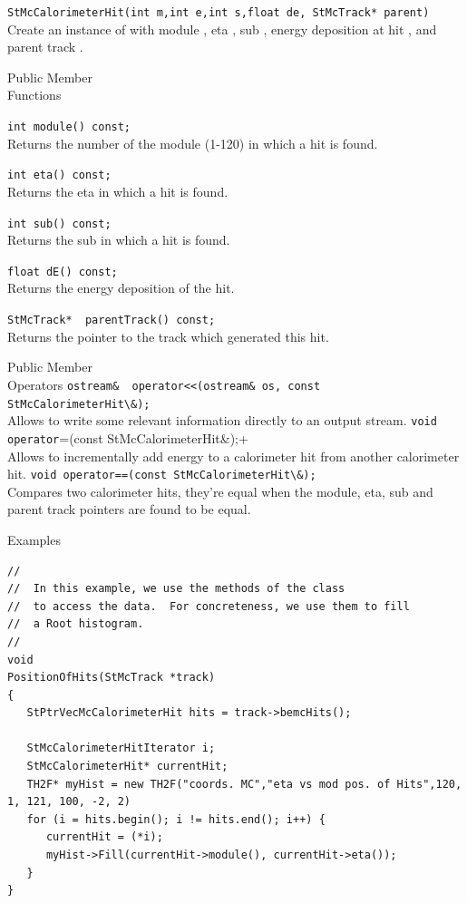 \begin{Entry}
    \verb+StMcCalorimeterHit(int m,int e,int s,float de, StMcTrack* parent)+\\
    Create an instance of  with module ,
    eta , sub , energy deposition at hit ,
    and parent track .

\item[Public Member\\ Functions]

    \verb+int module() const;+\\
    Returns the number of the module (1-120) in which a hit is found. 

    \verb+int eta() const;+\\
    Returns the eta in which a hit is found. 

    \verb+int sub() const;+\\
    Returns the sub in which a hit is found. 

    \verb+float dE() const;+\\
    Returns the energy deposition of the hit.

    \verb+StMcTrack*  parentTrack() const;+\\
    Returns the pointer to the track which generated this hit.

\item[Public Member\\ Operators]
    \verb+ostream&  operator<<(ostream& os, const StMcCalorimeterHit\&);+\\
    Allows to write some relevant information directly to an output
    stream.
    \verb+void operator+=(const StMcCalorimeterHit\&);+\\
    Allows to incrementally add energy to a calorimeter hit from another
    calorimeter hit.
    \verb+void operator==(const StMcCalorimeterHit\&);+\\
    Compares two calorimeter hits, they're equal when the module, eta, sub
    and parent track pointers are found to be equal.

\item[Examples]
{\footnotesize
\begin{verbatim}
//
//  In this example, we use the methods of the class
//  to access the data.  For concreteness, we use them to fill
//  a Root histogram. 
//  
void
PositionOfHits(StMcTrack *track)
{
   StPtrVecMcCalorimeterHit hits = track->bemcHits();

   StMcCalorimeterHitIterator i;
   StMcCalorimeterHit* currentHit;
   TH2F* myHist = new TH2F("coords. MC","eta vs mod pos. of Hits",120, 1, 121, 100, -2, 2)
   for (i = hits.begin(); i != hits.end(); i++) {
      currentHit = (*i);
      myHist->Fill(currentHit->module(), currentHit->eta());
   }
}
\end{verbatim}
}%
\end{Entry}
\clearpage
%
%
